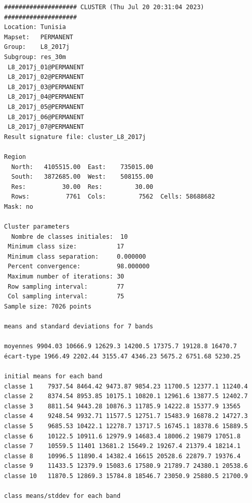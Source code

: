 \documentclass[land,article,submit,pdftex,moreauthors]{Definitions/mdpi}
\begin{document}
\begin{scriptsize}
\begin{verbatim}
#################### CLUSTER (Thu Jul 20 20:31:04 2023) ####################
Location: Tunisia
Mapset:   PERMANENT
Group:    L8_2017j
Subgroup: res_30m
 L8_2017j_01@PERMANENT
 L8_2017j_02@PERMANENT
 L8_2017j_03@PERMANENT
 L8_2017j_04@PERMANENT
 L8_2017j_05@PERMANENT
 L8_2017j_06@PERMANENT
 L8_2017j_07@PERMANENT
Result signature file: cluster_L8_2017j

Region
  North:   4105515.00  East:    735015.00
  South:   3872685.00  West:    508155.00
  Res:          30.00  Res:         30.00
  Rows:          7761  Cols:         7562  Cells: 58688682
Mask: no

Cluster parameters
  Nombre de classes initiales: 	10
 Minimum class size:           17
 Minimum class separation:     0.000000
 Percent convergence:          98.000000
 Maximum number of iterations: 30
 Row sampling interval:        77
 Col sampling interval:        75
Sample size: 7026 points

means and standard deviations for 7 bands

moyennes 9904.03 10666.9 12629.3 14200.5 17375.7 19128.8 16470.7
écart-type 1966.49 2202.44 3155.47 4346.23 5675.2 6751.68 5230.25

initial means for each band
classe 1    7937.54 8464.42 9473.87 9854.23 11700.5 12377.1 11240.4
classe 2    8374.54 8953.85 10175.1 10820.1 12961.6 13877.5 12402.7
classe 3    8811.54 9443.28 10876.3 11785.9 14222.8 15377.9 13565
classe 4    9248.54 9932.71 11577.5 12751.7 15483.9 16878.2 14727.3
classe 5    9685.53 10422.1 12278.7 13717.5 16745.1 18378.6 15889.5
classe 6    10122.5 10911.6 12979.9 14683.4 18006.2 19879 17051.8
classe 7    10559.5 11401 13681.2 15649.2 19267.4 21379.4 18214.1
classe 8    10996.5 11890.4 14382.4 16615 20528.6 22879.7 19376.4
classe 9    11433.5 12379.9 15083.6 17580.9 21789.7 24380.1 20538.6
classe 10   11870.5 12869.3 15784.8 18546.7 23050.9 25880.5 21700.9

class means/stddev for each band


\end{verbatim}
\end{scriptsize}
\end{document}

